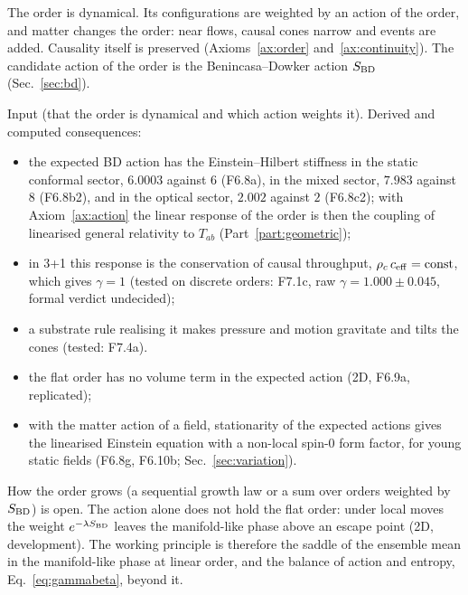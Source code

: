 \begin{axiom}\label{ax:dynamics}
The order is dynamical. Its configurations are weighted by an action of the order, and matter
changes the order: near flows, causal cones narrow and events are added. Causality itself is
preserved (Axioms~\ref{ax:order} and~\ref{ax:continuity}). The candidate action of the order is the
Benincasa--Dowker action $S_{\mathrm{BD}}$ (Sec.~\ref{sec:bd}).
\end{axiom}
\begin{status} Input (that the order is dynamical and which action weights it). Derived and computed
consequences:
\begin{itemize}
\item the expected BD action has the Einstein--Hilbert stiffness in the static conformal sector,
  $6.0003$ against $6$ (F6.8a), in the mixed sector, $7.983$ against $8$ (F6.8b2), and in the optical sector,
  $2.002$ against $2$ (F6.8c2); with Axiom~\ref{ax:action} the linear response of the order is then
  the coupling of linearised general relativity to $T_{ab}$ (Part~\ref{part:geometric});
\item in 3+1 this response is the conservation of causal throughput, $\rho_c\,c_{\rm eff}=\text{const}$,
  which gives $\gamma=1$ (tested on discrete orders: F7.1c, raw $\gamma=1.000\pm0.045$, formal verdict
  undecided);
\item a substrate rule realising it makes pressure and motion gravitate and tilts the cones
  (tested: F7.4a).
\end{itemize}
\begin{itemize}
\item the flat order has no volume term in the expected action (2D, F6.9a, replicated);
\item with the matter action of a field, stationarity of the expected actions gives the linearised Einstein
  equation with a non-local spin-0 form factor, for young static fields (F6.8g, F6.10b; Sec.~\ref{sec:variation}).
\end{itemize}
How the order grows (a sequential growth law or a sum over orders weighted by $S_{\mathrm{BD}}$) is
open. The action alone does not hold the flat order: under local moves the weight $e^{-\lambda S_{\mathrm{BD}}}$ leaves the
manifold-like phase above an escape point (2D, development). The working principle is therefore the saddle of the
ensemble mean in the manifold-like phase at linear order, and the balance of action and entropy,
Eq.~\eqref{eq:gammabeta}, beyond it. \end{status}

